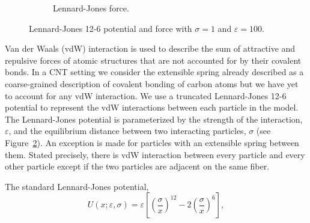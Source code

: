 \begin{figure}[t]
\begin{subfigure}[t]{.5\textwidth}
			\caption{Lennard-Jones force. \label{subfig:LJForce}}
		\end{subfigure}		
		\caption{Lennard-Jones 12-6 potential and force with $\sigma = 1$ and $\varepsilon = 100$.\label{fig:LJ}}	
	\end{figure}

   Van der Waals (vdW) interaction is used to describe the sum of attractive and repulsive forces of atomic structures that are not accounted for by their covalent bonds. In a CNT setting we consider the extensible spring already described as a coarse-grained description of covalent bonding of carbon atoms but we have yet to account for any vdW interaction. We use a truncated Lennard-Jones 12-6 potential to represent the vdW interactions between each particle in the model. The Lennard-Jones potential is parameterized by the strength of the interaction, $\varepsilon$, and the equilibrium distance between two interacting particles, $\sigma$ (see Figure~\ref{fig:LJ}). An exception is made for particles with an extensible spring between them. Stated precisely, there is vdW interaction between every particle and every other particle except if the two particles are adjacent on the same fiber.
	
The standard Lennard-Jones potential,
\begin{equation}
	U(x; \varepsilon, \sigma) = \varepsilon \left[ \left( \frac{\sigma}{x} \right)^{12} - 2 \left( \frac{\sigma}{x} \right)^6 \right],
\end{equation}

